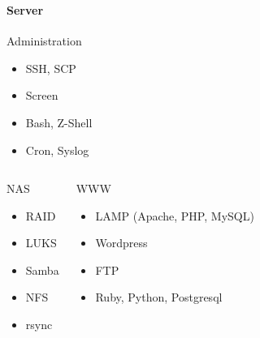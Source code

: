 \documentclass[utf8]{beamer}
\begin{document}
\begin{frame}
  \frametitle{\insertsectionhead}
  \framesubtitle{Server}

\begin{block}{Administration}
  \begin{itemize}
    \item SSH, SCP
    \item Screen
    \item Bash, Z-Shell
    \item Cron, Syslog
  \end{itemize}
\end{block}

\begin{columns}
\begin{block}{NAS}
  \begin{itemize}
    \item RAID
    \item LUKS
    \item Samba
    \item NFS
    \item rsync
  \end{itemize}
\end{block}

\begin{block}{WWW}
  \begin{itemize}
    \item LAMP (Apache, PHP, MySQL)
    \item Wordpress
    \item FTP
    \item Ruby, Python, Postgresql
  \end{itemize}
\end{block}
\end{columns}
\end{frame}
\end{document}
